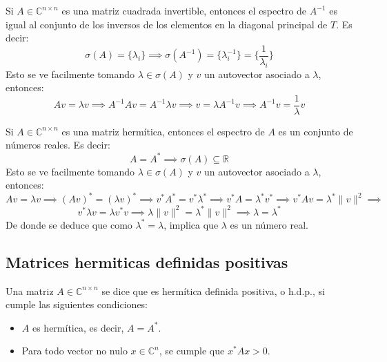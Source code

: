 \begin{corolario}
    Si $ A \in \mathbb{C}^{n \times n} $ es una matriz cuadrada invertible, entonces el espectro de $ A^{-1} $ es igual al conjunto de los inversos de los elementos en la diagonal principal de $ T $. Es decir:
    \[
        \sigma(A) = \{\lambda_i \} \implies
        \sigma(A^{-1}) = \{ \lambda_i^{-1} \} = \{ \frac{1}{\lambda_i} \}
    \]
    Esto se ve facilmente tomando $\lambda \in \sigma(A)$ y $v$ un autovector asociado a $\lambda$, entonces:
    \[
        Av = \lambda v \implies
        A^{-1} Av = A^{-1} \lambda v \implies
        v = \lambda A^{-1} v \implies
        A^{-1} v = \frac{1}{\lambda} v
    \]
    
\end{corolario}

\begin{corolario}
    Si $ A \in \mathbb{C}^{n \times n} $ es una matriz hermítica, entonces el espectro de $ A $ es un conjunto de números reales. Es decir:
    \[
        A = A^* \implies
        \sigma(A) \subseteq \mathbb{R}
    \]
    Esto se ve facilmente tomando $\lambda \in \sigma(A)$ y $v$ un autovector asociado a $\lambda$, entonces:
    \[
        Av = \lambda v \implies
        (Av)^* = (\lambda v)^* \implies
        v^* A^* = v^* \lambda^* \implies
        v^* A = \lambda^* v^* \implies
        v^* Av = \lambda^* \| v\|^2 \implies
    \]
    \[
        v^* \lambda v = \lambda v^* v \implies
        \lambda \| v\|^2 = \lambda^* \| v\|^2 \implies
        \lambda = \lambda^*
    \]
    De donde se deduce que como $ \lambda^* = \lambda $, implica que $ \lambda $ es un número real.
\end{corolario}

\subsection{Matrices hermiticas definidas positivas}

\begin{definición}
    Una matriz $ A \in \mathbb{C}^{n \times n} $ se dice que es hermítica definida positiva, o h.d.p., si cumple las siguientes condiciones:
    \begin{itemize}
        \item $ A $ es hermítica, es decir, $ A = A^* $.
        \item Para todo vector no nulo $ x \in \mathbb{C}^n $, se cumple que $ x^* A x > 0 $.
    \end{itemize}
\end{definición}

